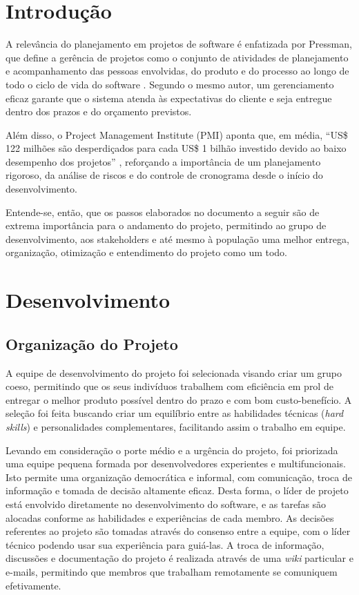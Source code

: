 \documentclass[a4paper, 12pt]{article}
\begin{document}

\newpage

\section{Introdução}
A relevância do planejamento em projetos de software é enfatizada por Pressman, que define a gerência de projetos como o conjunto de atividades de planejamento e acompanhamento das pessoas envolvidas, do produto e do processo ao longo de todo o ciclo de vida do software \cite{pressman2010}. Segundo o mesmo autor, um gerenciamento eficaz garante que o sistema atenda às expectativas do cliente e seja entregue dentro dos prazos e do orçamento previstos.  

Além disso, o Project Management Institute (PMI) aponta que, em média, “US\$ 122 milhões são desperdiçados para cada US\$ 1 bilhão investido devido ao baixo desempenho dos projetos” \cite{pmi-2016}, reforçando a importância de um planejamento rigoroso, da análise de riscos e do controle de cronograma desde o início do desenvolvimento.  

Entende-se, então, que os passos elaborados no documento a seguir são de extrema importância para o andamento do projeto, permitindo ao grupo de desenvolvimento, aos stakeholders e até mesmo à população uma melhor entrega, organização, otimização e entendimento do projeto como um todo.

\newpage
\section{Desenvolvimento}
\subsection{Organização do Projeto}
A equipe de desenvolvimento do projeto foi selecionada visando criar um grupo coeso, permitindo que os seus indivíduos trabalhem com eficiência em prol de entregar o melhor produto possível dentro do prazo e com bom custo-benefício. A seleção foi feita buscando criar um equilíbrio entre as habilidades técnicas (\textit{hard skills}) e personalidades complementares, facilitando assim o trabalho em equipe.

Levando em consideração o porte médio e a urgência do projeto, foi priorizada uma equipe pequena formada por desenvolvedores experientes e multifuncionais. Isto permite uma organização democrática e informal, com comunicação, troca de informação e tomada de decisão altamente eficaz. Desta forma, o líder de projeto está envolvido diretamente no desenvolvimento do software, e as tarefas são alocadas conforme as habilidades e experiências de cada membro. As decisões referentes ao projeto são tomadas através do consenso entre a equipe, com o líder técnico podendo usar sua experiência para guiá-las. A troca de informação, discussões e documentação do projeto é realizada através de uma \textit{wiki} particular e e-mails, permitindo que membros que trabalham remotamente se comuniquem efetivamente.
\end{document}
